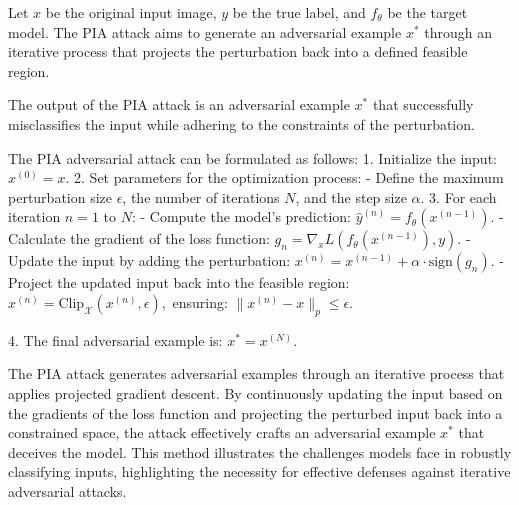 Let \( x \) be the original input image, \( y \) be the true label, and \( f_{\theta} \) be the target model. The PIA attack aims to generate an adversarial example \( x^* \) through an iterative process that projects the perturbation back into a defined feasible region.

The output of the PIA attack is an adversarial example \( x^* \) that successfully misclassifies the input while adhering to the constraints of the perturbation.

The PIA adversarial attack can be formulated as follows:
1. Initialize the input:
   $
   x^{(0)} = x.
   $
2. Set parameters for the optimization process:
   - Define the maximum perturbation size \( \epsilon \), the number of iterations \( N \), and the step size \( \alpha \).
3. For each iteration \( n = 1 \) to \( N \):
   - Compute the model's prediction:
   $
   \hat{y}^{(n)} = f_{\theta}(x^{(n-1)}).
   $
   - Calculate the gradient of the loss function:
   $
   g_n = \nabla_x L(f_{\theta}(x^{(n-1)}), y).
   $
   - Update the input by adding the perturbation:
   $
   x^{(n)} = x^{(n-1)} + \alpha \cdot \text{sign}(g_n).
   $
   - Project the updated input back into the feasible region:
   $
   x^{(n)} = \text{Clip}_{\mathcal{X}}(x^{(n)}, \epsilon),
   $
   ensuring:
   $
   \|x^{(n)} - x\|_p \leq \epsilon.
   $

4. The final adversarial example is:
   $
   x^* = x^{(N)}.
   $

The PIA attack generates adversarial examples through an iterative process that applies projected gradient descent. By continuously updating the input based on the gradients of the loss function and projecting the perturbed input back into a constrained space, the attack effectively crafts an adversarial example \( x^* \) that deceives the model. This method illustrates the challenges models face in robustly classifying inputs, highlighting the necessity for effective defenses against iterative adversarial attacks.
